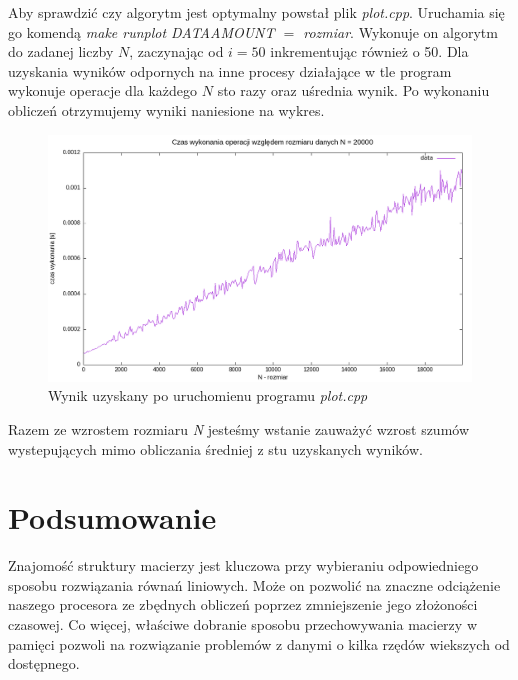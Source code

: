 \documentclass{article}
\begin{document}
    Aby sprawdzić czy algorytm jest optymalny powstał plik \textit{plot.cpp}. Uruchamia się go komendą \textit{make runplot DATA\textunderscore AMOUNT $=$ rozmiar}. Wykonuje on algorytm do zadanej liczby $N$, zaczynając od $i=50$ inkrementując również o 50. Dla uzyskania wyników odpornych na inne procesy działające w tle program wykonuje operacje dla każdego $N$ sto razy oraz uśrednia wynik. Po wykonaniu obliczeń otrzymujemy wyniki naniesione na wykres.\\
    \newpage

    \begin{figure}[!ht]
      \includegraphics[width=\linewidth]{wyniki.png}
      \caption{Wynik uzyskany po uruchomienu programu \textit{plot.cpp}}
    \end{figure}

    Razem ze wzrostem rozmiaru \textit{N} jesteśmy wstanie zauważyć wzrost szumów wystepujących mimo obliczania średniej z stu uzyskanych wyników.
  \section{Podsumowanie}
    Znajomość struktury macierzy jest kluczowa przy wybieraniu odpowiedniego sposobu rozwiązania równań liniowych. Może on pozwolić na znaczne odciążenie naszego procesora ze zbędnych obliczeń poprzez zmniejszenie jego złożoności czasowej. Co więcej, właściwe dobranie sposobu przechowywania macierzy w pamięci pozwoli na rozwiązanie problemów z danymi o kilka rzędów wiekszych od dostępnego.
\end{document}
